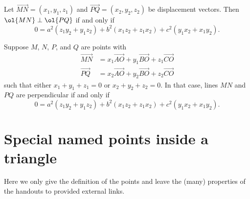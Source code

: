 \documentclass[11pt]{scrartcl}
\begin{document}
\begin{theorem}
  Let $\overrightarrow{MN} = (x_1, y_1, z_1)$
  and $\overrightarrow{PQ} = (x_2, y_2, z_2)$ be displacement vectors.
  Then $\ol{MN} \perp \ol{PQ}$ if and only if
  \[  0 = a^2(z_1y_2 + y_1z_2) + b^2(x_1z_2 + z_1x_2) + c^2(y_1x_2 + x_1y_2). \]
\end{theorem}

\begin{theorem}
  Suppose $M$, $N$, $P$, and $Q$ are points with
  \begin{align*}
    \overrightarrow{MN} &= x_1 \overrightarrow{AO} + y_1 \overrightarrow{BO} + z_1 \overrightarrow{CO} \\
    \overrightarrow{PQ} &= x_2 \overrightarrow{AO} + y_2 \overrightarrow{BO} + z_2 \overrightarrow{CO}
  \end{align*}
  such that either $x_1+y_1+z_1=0$ or $x_2+y_2+z_2=0$.
  In that case, lines $MN$ and $PQ$ are perpendicular if and only if
  \[ 0 = a^2(z_1y_2 + y_1z_2) + b^2(x_1z_2 + z_1x_2) + c^2(y_1x_2 + x_1y_2). \]
\end{theorem}


\section{Special named points inside a triangle}
Here we only give the definition of the points
and leave the (many) properties of the handouts to provided external links.
\end{document}
